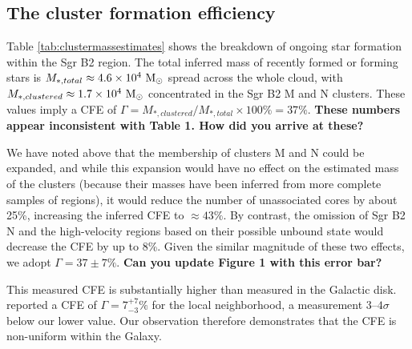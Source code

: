\documentclass[twocolumn]{aastex62}
\begin{document}

\clearpage

\clearpage

\subsection{The cluster formation efficiency}
Table \ref{tab:clustermassestimates} shows the breakdown of ongoing star
formation within the Sgr B2 region.  The total inferred mass of recently
formed or forming stars is ${M_{*,total}\approx4.6\times10^{4}~\mathrm{M}_{\odot}}$ spread across
the whole cloud, with ${M_{*,clustered}\approx1.7\times10^{4}~\mathrm{M}_{\odot}}$ concentrated
in the Sgr B2 M and N clusters.  These values imply a CFE of $\Gamma=M_{*,clustered}/M_{*,total}\times100\% = 37\%$. {\bf These numbers appear inconsistent with Table 1. How did you arrive at these?}

We have noted above that the membership of clusters M and N could be expanded,
and while this expansion would have no effect on the estimated mass of the clusters
(because their masses have been inferred from more complete samples of \hii regions),
it would reduce the number of unassociated cores by about 25\%, increasing the inferred
CFE to $\approx43\%$. By contrast, the omission of Sgr B2 N and the high-velocity \hii regions based on their possible unbound state would decrease the CFE by up to 8\%. Given the similar magnitude of these two effects, we adopt $\Gamma=37\pm7\%$. {\bf Can you update Figure 1 with this error bar?}

This measured CFE is substantially higher than measured in the Galactic disk.
\citet{Lada2003a} reported a CFE of $\Gamma=7^{+7}_{-3}\%$ for the local neighborhood, a
measurement $3$--$4\sigma$ below our lower value.  Our observation therefore demonstrates
that the CFE is non-uniform within the Galaxy.
\end{document}
